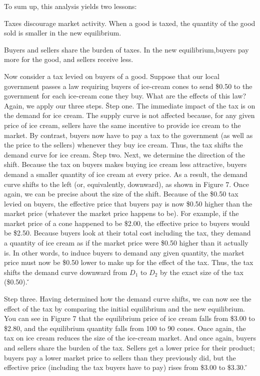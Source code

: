 To sum up, this analysis yields two lessons:
\bit
\item Taxes discourage market activity. When a good is taxed, the quantity of the good sold is smaller in the new
equilibrium.
\item Buyers and sellers share the burden of taxes. In the new equilibrium,buyers pay more for the good, and sellers
receive less.
\eit

Now consider a tax levied on buyers of a good. Suppose that our local government passes a law requiring buyers of
ice-cream cones to send \$0.50 to the government for each ice-cream cone they buy. What are the effects of this law?
Again, we apply our three steps. \v

Step one. The immediate impact of the tax is on the demand for ice cream. The supply curve is not affected because,
for any given price of ice cream, sellers have the same incentive to provide ice cream to the market. By contrast,
buyers now have to pay a tax to the government (as well as the price to the sellers) whenever they buy ice cream.
Thus, the tax shifts the demand curve for ice cream. \v

Step two. Next, we determine the direction of the shift. Because the tax on buyers makes buying ice cream less
attractive, buyers demand a smaller quantity of ice cream at every price. As a result, the demand curve shifts to the
left (or, equivalently, downward), as shown in Figure 7. Once again, we can be precise about the size of the shift.
Because of the \$0.50 tax levied on buyers, the effective price that buyers pay is now \$0.50 higher than the market
price (whatever the market price happens to be). For example, if the market price of a cone happened to be \$2.00,
the effective price to buyers would be \$2.50. Because buyers look at their total cost including the tax, they demand
a quantity of ice cream as if the market price were \$0.50 higher than it actually is. In other words, to induce
buyers to demand any given quantity, the market price must now be \$0.50 lower to make up for the effect of the tax.
Thus, the tax shifts the demand curve downward from $D_1$ to $D_2$ by the exact size of the tax (\$0.50). \v


Step three. Having determined how the demand curve shifts, we can now see the effect of the tax by comparing the
initial equilibrium and the new equilibrium. You can see in Figure 7 that the equilibrium price of ice cream falls
from \$3.00 to \$2.80, and the equilibrium quantity falls from 100 to 90 cones. Once again, the tax on ice cream
reduces the size of the ice-cream market. And once again, buyers and sellers share the burden of the tax. Sellers get
a lower price for their product; buyers pay a lower market price to sellers than they previously did, but the
effective price (including the tax buyers have to pay) rises from \$3.00 to \$3.30. \v

